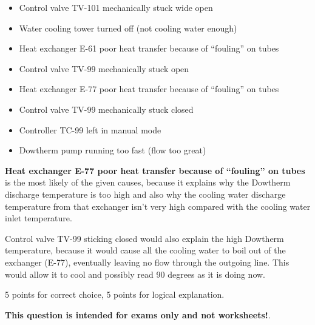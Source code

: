 \begin{itemize}
\item{} Control valve TV-101 mechanically stuck wide open
\item{} Water cooling tower turned off (not cooling water enough)
\item{} Heat exchanger E-61 poor heat transfer because of ``fouling'' on tubes
\item{} Control valve TV-99 mechanically stuck open
\item{} Heat exchanger E-77 poor heat transfer because of ``fouling'' on tubes
\item{} Control valve TV-99 mechanically stuck closed
\item{} Controller TC-99 left in manual mode
\item{} Dowtherm pump running too fast (flow too great)
\end{itemize}

\filbreak








{\bf Heat exchanger E-77 poor heat transfer because of ``fouling'' on tubes} is the most likely of the given causes, because it explains why the Dowtherm discharge temperature is too high and also why the cooling water discharge temperature from that exchanger isn't very high compared with the cooling water inlet temperature.

Control valve TV-99 sticking closed would also explain the high Dowtherm temperature, because it would cause all the cooling water to boil out of the exchanger (E-77), eventually leaving no flow through the outgoing line.  This would allow it to cool and possibly read 90 degrees as it is doing now.

\vskip 10pt

5 points for correct choice, 5 points for logical explanation.







{\bf This question is intended for exams only and not worksheets!}.



